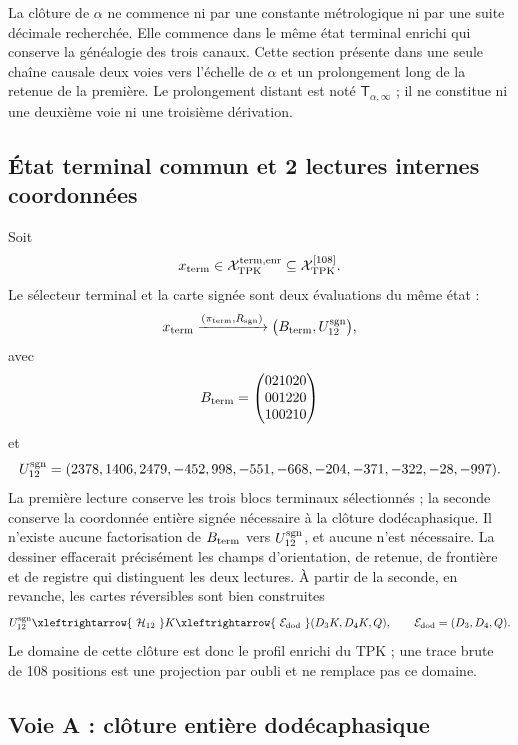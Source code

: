 
\label{sec:alpha-dos-vias-t1-rev8}

La clôture de \(\alpha\) ne commence ni par une constante métrologique ni par une
suite décimale recherchée. Elle commence dans le même état terminal enrichi qui
conserve la généalogie des trois canaux. Cette section présente dans une seule
chaîne causale deux voies vers l’échelle de \(\alpha\) et un prolongement long
de la retenue de la première. Le prolongement distant est noté
\(\mathsf T_{\alpha,\infty}\) ; il ne constitue ni une deuxième voie ni une troisième
dérivation.

\subsection{État terminal commun et 2 lectures internes coordonnées}

Soit
\[
 x_{\rm term}\in\mathcal X_{\rm TPK}^{\rm term,enr}
 \subseteq\mathcal X_{\rm TPK}^{[108]}.
\]
Le sélecteur terminal et la carte signée sont deux évaluations du même état :
\begin{equation}
 x_{\rm term}
 \xrightarrow{(\pi_{\rm term},R_{\rm sgn})}
 \bigl(B_{\rm term},U_{12}^{\rm sgn}\bigr),
 \label{eq:alpha-rev8-doble-lectura-terminal}
\end{equation}
avec
\[
 B_{\rm term}=
 \begin{pmatrix}
 021020\\001220\\100210
 \end{pmatrix}
\]
et
\[
 U_{12}^{\rm sgn}
 =(2378,1406,2479,-452,998,-551,-668,-204,-371,-322,-28,-997).
\]
La première lecture conserve les trois blocs terminaux sélectionnés ; la
seconde conserve la coordonnée entière signée nécessaire à la clôture
dodécaphasique. Il n’existe aucune factorisation de
\(B_{\rm term}\) vers \(U_{12}^{\rm sgn}\), et aucune n’est nécessaire. La dessiner effacerait précisément les
champs d’orientation, de retenue, de frontière et de registre qui distinguent les deux
lectures. À partir de la seconde, en revanche, les cartes réversibles sont bien construites
\[
 U_{12}^{\rm sgn}
 \xleftrightarrow{\ \mathcal H_{12}\ }K
 \xleftrightarrow{\ \mathcal E_{\rm dod}\ }
 (D_3K,D_4K,Q),
 \qquad
 \mathcal E_{\rm dod}=(D_3,D_4,Q).
\]
Le domaine de cette clôture est donc le profil enrichi du TPK ; une
trace brute de 108 positions est une projection par oubli et ne remplace pas ce
domaine.

\subsection{Voie A : clôture entière dodécaphasique}

